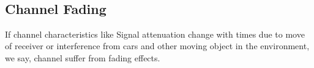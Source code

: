 ~\vspace{-2.5em}
\subsection{Channel Fading}
If channel characteristics like Signal attenuation change with times due to move of receiver or interference from cars and other moving object in the environment, we say, channel suffer from fading effects.
